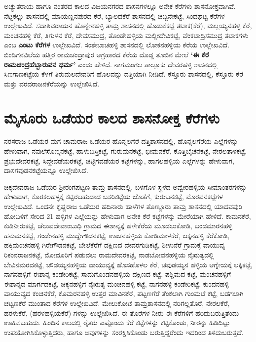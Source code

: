 ಅಚ್ಯುತರಾಯ ಹಾಗೂ ನಂತರದ ಕಾಲದ ವಿಜಯನಗರದ ಶಾಸನಗಳಲ್ಲೂ ಅನೇಕ ಕೆರೆಗಳು ಶಾಸನೋಕ್ತವಾಗಿವೆ. ನೆಟ್ಟಕಲ್ಲು ಶಾಸನದಲ್ಲಿ ಮಾಯಣ್ಣನಪುರದ ಕೆರೆ, ಬ್ಯಾಲದಕೆರೆ ಶಾಸನದಲ್ಲಿ ಚಿಬ್ಬನೇಕಟ್ಟೆ, ಸಿಂದಘಟ್ಟ ಕೆರೆಗಳ ಉಲ್ಲೇಖವಿದೆ. ಸದಾಶಿವರಾಯನ ಹೊನ್ನೇನಹಳ್ಳಿ ತಾಮ್ರ ಶಾಸನದಲ್ಲಿ ಹೊಡುಕೆಕಟ್ಟೆ ತಟಾಕ(ಕೆರೆ), ಮಲ್ಲಯ್ಯನಹಳ್ಳಿ ಕೆರೆ, ಮಂಚನಹಳ್ಳಿ ಕೆರೆ, ತಿಗುಳನ ಕೆರೆ, ದೇವಸಮುದ್ರ, ತೊಂಡೇಹಳ್ಳಿಯ ಮಲ್ಲೀದೇವಿಕಟ್ಟೆ, ವೆಂಕಟಾದ್ರಿಸಮುದ್ರ ತಟಾಕಗಳು ಎಂಬ \textbf{ಎಂಟು ಕೆರೆಗಳ} ಉಲ್ಲೇಖವಿದೆ. ಸಂತೇಬಾಚಹಳ್ಳಿ ಶಾಸನದಲ್ಲಿ ಲೋಕನಹಳ್ಳಿಯ ಕೆರೆಯ ಉಲ್ಲೇಖವಿದೆ. ಬಿಂಡಿಗನವಿಲೆಯ ಹತ್ತಿರ ರಾಮಚಂದ್ರಾಪುರ ಅಗ್ರಹಾರದ ಕೆರೆಯ ದೊಡ್ಡ ತೂಬಿನ ಮೇಲೆ \textbf{‘ಈ ಕೆರೆ ರಾಮಚಂದ್ರಹೆಬ್ಬಾರುವನ ಧರ್ಮ’} ಎಂದು ಹೇಳಿದೆ. ನಾಗಮಂಗಲ ತಾಲ್ಲೂಕು ದೇವರಹಳ್ಳಿ ಶಾಸನದಲ್ಲಿ ಸಿಣಗಾಣಕಟ್ಟೆಯ ಕೆಳಗೆ ತಿರುಮಲದೇವರಿಗೆ ಹೊಲವನ್ನು ದತ್ತಿಯಾಗಿ ನೀಡಿದೆ. ಕೆಸ್ತೂರು ಶಾಸನದಲ್ಲಿ, ಕೆಸ್ತೂರು ಕೆರೆ ಮತ್ತು ವರದರಾಜನಕೆರೆಯನ್ನು ಉಲ್ಲೇಖಿಸಿದೆ.


\section{ಮೈಸೂರು ಒಡೆಯರ ಕಾಲದ ಶಾಸನೋಕ್ತ ಕೆರೆಗಳು}

ನರಸರಾಜ ಒಡೆಯರ ಮಗ ಚಾಮರಾಜ ಒಡೆಯರ ಹೊನ್ನಲಗೆರೆ ದತ್ತಿಶಾಸನದಲ್ಲಿ, ಹೊನ್ನಲಗೆರೆಯ ಎಲ್ಲೆಗಳನ್ನು ಹೇಳುವಾಗ, ನವುಲೆಸೊಣ್ನನಕಟ್ಟೆ, ಹಾಳುಬಸ್ತಿಕಟ್ಟೆ, ಗುರುಮನಕಟ್ಟೆ, ಭೀಮನಕೆರೆ, ಕೊತ್ತಿಬೈಚನಕಟ್ಟೆ, ನೇರಲತಾಳಕಟ್ಟೆ, ಪ್ರಭುದೇವರಕಟ್ಟೆ, ಸಿದ್ಧೇವಡೆಯರಕಟ್ಟೆ, ಚಿಟ್ಟಿಗವಡೆಯರ ಕಟ್ಟೆಗಳನ್ನು, ಹಾಗಲಹಳ್ಳಿಯ ಎಲ್ಲೆಗಳನ್ನು ಹೇಳುವಾಗ, ದಾಸಗವುಡನಕಟ್ಟೆಯನ್ನೂ ಉಲ್ಲೇಖಿಸಿದೆ.

ಚಿಕ್ಕದೇವರಾಜ ಒಡೆಯರ ಶ‍್ರೀರಂಗಪಟ್ಟಣ ತಾಮ್ರ ಶಾಸನದಲ್ಲಿ, ಬಳಗೊಳ ಸ್ಥಳದ ಅವ್ವೇರಹಳ್ಳಿಯ ಸೀಮಾಂತರಗಳನ್ನು ಹೇಳುವಾಗ, ಕೊರಕಲಹಳ್ಳಕ್ಕೆ ಕಟ್ಟಿರಬಹುದಾದ ಬಸರಿಕಟ್ಟೆಯ ಜೊತೆಗೆ, ಕುರುಬನಕಟ್ಟೆ, ಮೊರವನಕಟ್ಟೆಗಳ ಉಲ್ಲೇಖವಿದೆ. ಒಂದನೇ ಕೃಷ್ಣರಾಜ ಒಡೆಯರ ಹದಿನಾರು ಹಾಳೆಗಳ ತೊಣ್ಣೂರು ತಾಮ್ರ ಶಾಸನದಲ್ಲಿ ಯಾದವಪುರಿ ಹೋಬಳಿಗೆ ಸೇರಿದ 21 ಹಳ್ಳಿಗಳ ಎಲ್ಲೆಯನ್ನು ಹೇಳುವಾಗ ಅನೇಕ ಕೆರೆ ಕಟ್ಟೆಗಳನ್ನು ಮೇರೆಯಾಗಿ ಹೇಳಿದೆ. ಕಾಮನಕೆರೆ, ಕುಡಿನೀರುಕಟ್ಟೆ, ಚೆಲುವದೇವಾಂಬುಧಿ ಗ್ರಾಮದ ಈಶಾನ್ಯಕ್ಕೆ ಹಳೇಕೆರೆಯ ಮೂಡಲುಕೋಡಿ, ಬಂಡಮಾರನಹಳ್ಳಿ ಹನುಮನಕಟ್ಟೆ, ಗಂಡೇನಹಳ್ಳಿ ಮುದ್ದೇಗೌಡನಕಟ್ಟೆ, ಊಚನಹಳ್ಳಿಯ ಕೋಡಿಮಾಳಕೆರೆ, ಜಕ್ಕನಹಳ್ಳಿ ಕೆರೆಕೋಡಿ, ಹಕ್ಕಿಮಂಚನಹಳ್ಳಿ ಗಿರೇಗೌಡನಕಟ್ಟೆ, ಬೇಲೆಕೆರೆಗೆ ದಕ್ಷಿಣದ ದೇವರಗುಡಿಕಟ್ಟೆ, ಶೀಳುನೆರೆ ಗ್ರಾಮಕ್ಕೆ ವಾಯುವ್ಯ ರಿಕಂನರಾಜನಕಟ್ಟೆ, ಮೋದೂರಿಗೆ ಪಡುವಲು ರಾಮದೇವರಕಟ್ಟೆ, ನಾಡಬೋವನಹಳ್ಳಿಯ ನೈಋತ್ಯದಲ್ಲಿ ಬೇವಿನಮರದಕಟ್ಟೆ, ಚೌಡಯ್ಯನಹಳ್ಳಿಯ ವಾಯುವ್ಯಕ್ಕೆ ಹೊಸಹೊಳಲ ಕೆರೆ, ಚವುಡಯ್ಯನ ಹಳ್ಳಿಯ ಆಗ್ನೇಯಕ್ಕೆ ಲಕ್ಕಿಕಟ್ಟೆ, ನಾಗನಹಳ್ಳಿಗೆ ಈಶಾನ್ಯ ಕಂಡೇರಿಕಟ್ಟೆ, ಸಾದುಗೊಂಡನಹಳ್ಳಿಯ ದಕ್ಷಿಣದ ಕಟ್ಟೆ, ಪಶ್ಚಿಮದ ಕಟ್ಟೆ, ಮಂಚನಹಳ್ಳಿಗೆ ಈಶಾನ್ಯದ ಮಾರ್ಗದಕಟ್ಟೆ, ಚಿಕ್ಕನಹಳ್ಳಿಗೆ ನೈಋತ್ಯ ಮಂಚನಹಳ್ಳಿ ಕಟ್ಟೆ, ನಾಗನಹಳ್ಳಿ ಕಂಡೇರಿಕಟ್ಟೆ, ಕುಂದನಹಳ್ಳಿ ವಾಯುವ್ಯದ ಕಂಚಿನಕೆರೆ, ಕೊಮರನಹಳ್ಳಿ ಉತ್ತರ ಮಾವಿನಕೆರೆ, ಪಟ್ಟಣಗೆರೆ ತೆಂಕಲಾಗಿ ಗುಂಮಟೆ ಕಟ್ಟೆ, ಬಡಗಲಾಗಿ ಚಟ್ಟಣಕೆರೆ ಮುಂತಾದ ಕೆರೆಗಳ ಉಲ್ಲೇಖವಿದೆ. ಮೇಲುಕೋಟೆ ತಾಮ್ರಶಾಸನದಲ್ಲಿ ನರಿಗಲ್ಲತೊರೆ, ನೇರಲಕೆರೆ, ಹರಳುಕೆರೆ, (ಹರಳಹಳ್ಳಿಯಕೆರೆ) ಗಳನ್ನು ಉಲ್ಲೇಖಿಸಿದೆ. ಈ ತೊರೆಗಳ ನೀರು ಈ ಕೆರೆಗಳಿಗೆ ಹರಿದುಬರುತ್ತಿತೆಂದು ಊಹಿಸಬಹುದು. ಹಿಂದಿನ ಕಾಲದಲ್ಲಿ ರೈತರು ಎಷ್ಟೊಂದು ಕೆರೆ ಕಟ್ಟೆಗಳನ್ನು ಕಟ್ಟಿಕೊಂಡು, ನೀರನ್ನು ಹಿಡಿದಿಟ್ಟು ಉಪಯೋಗಿಸಿಕೊಳ್ಳುತ್ತಿದರು, ಹಾಗೂ ಅವುಗಳನ್ನು ಸಂರಕ್ಷಿಸಿಕೊಂಡು ಬರುತ್ತಿದ್ದರೆಂದು ಇದರಿಂದ ತಿಳಿದುಬರುತ್ತದೆ.


